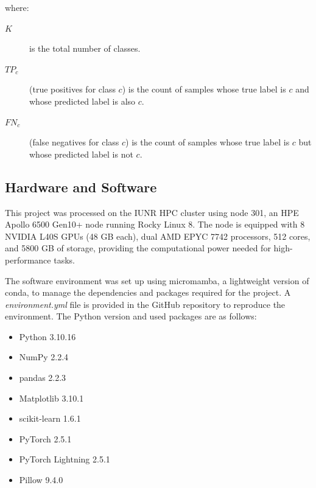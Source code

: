     \noindent where:
    \begin{description}
    \item[$K$] is the total number of classes.
    \item[$TP_{c}$] (true positives for class $c$) is the count of samples whose true label is $c$ and whose predicted label is also $c$.
    \item[$FN_{c}$] (false negatives for class $c$) is the count of samples whose true label is $c$ but whose predicted label is not $c$.
    \end{description}


    \subsection{Hardware and Software}

    This project was processed on the IUNR HPC cluster using node 301, an HPE Apollo 6500 Gen10+ node running Rocky Linux 8. 
    The node is equipped with 8 NVIDIA L40S GPUs (48 GB each), dual AMD EPYC 7742 processors, 512 cores, and 5800 GB of storage, providing the computational power needed for high-performance tasks.

    The software environment was set up using micromamba, a lightweight version of conda, to manage the dependencies and packages required for the project.
    A \textit{environment.yml} file is provided in the GitHub repository to reproduce the environment.
    The Python version and used packages are as follows:

    \begin{itemize}
        \item Python 3.10.16
        \item NumPy 2.2.4
        \item pandas 2.2.3
        \item Matplotlib 3.10.1
        \item scikit-learn 1.6.1
        \item PyTorch 2.5.1
        \item PyTorch Lightning 2.5.1
        \item Pillow 9.4.0
    \end{itemize}


